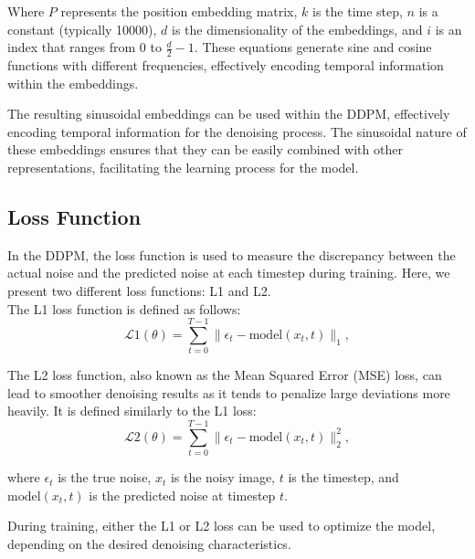 \documentclass[letterpaper]{article} %
\begin{document}
Where $P$ represents the position embedding matrix, $k$ is the time step, $n$ is a constant (typically 10000), $d$ is the dimensionality of the embeddings, and $i$ is an index that ranges from 0 to $\frac{d}{2} - 1$. These equations generate sine and cosine functions with different frequencies, effectively encoding temporal information within the embeddings.

The resulting sinusoidal embeddings can be used within the DDPM, effectively encoding temporal information for the denoising process. The sinusoidal nature of these embeddings ensures that they can be easily combined with other representations, facilitating the learning process for the model.

\subsection{Loss Function}
In the DDPM, the loss function is used to measure the discrepancy between the actual noise and the predicted noise at each timestep during training. Here, we present two different loss functions: L1 and L2.\\

\noindent The L1 loss function is defined as follows:
\begin{equation}
\mathcal{L}{\text{1}}(\theta) = \sum_{t=0}^{T-1} \lVert \epsilon_t - \text{model}(x_t, t) \rVert_1,
\end{equation}
    
\noindent The L2 loss function, also known as the Mean Squared Error (MSE) loss, can lead to smoother denoising results as it tends to penalize large deviations more heavily. It is defined similarly to the L1 loss:
\begin{equation}
\mathcal{L}{\text{2}}(\theta) = \sum_{t=0}^{T-1} \lVert \epsilon_t - \text{model}(x_t, t) \rVert_2^2,
\end{equation}

\noindent where $\epsilon_t$ is the true noise, $x_t$ is the noisy image, $t$ is the timestep, and $\text{model}(x_t, t)$ is the predicted noise at timestep $t$.

During training, either the L1 or L2 loss can be used to optimize the model, depending on the desired denoising characteristics.
\end{document}
